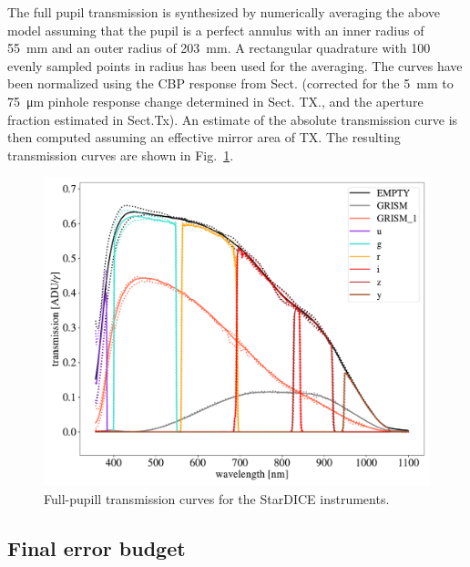 The full pupil transmission is synthesized by numerically averaging
the above model assuming that the pupil is a perfect annulus with an
inner radius of \SI{55}{mm} and an outer radius of \SI{203}{mm}. A
rectangular quadrature with 100 evenly sampled points in radius has
been used for the averaging. The curves have been normalized using the
CBP response from Sect. (corrected for the \SI{5}{mm} to
\SI{75}{\micro\meter} pinhole response change determined in Sect. TX.,
and the aperture fraction estimated in Sect.Tx).  An estimate of the
absolute transmission curve is then computed assuming an effective
mirror area of TX. The resulting transmission curves are shown in
Fig.~\ref{fig:fullpupiltrans}.
\begin{figure}
  \centering
  \includegraphics[width=1\linewidth]{fig/fullpupill.pdf}
  \caption{Full-pupill transmission curves for the StarDICE instruments.}
  \label{fig:fullpupiltrans}
\end{figure}



\subsection{Final error budget}
